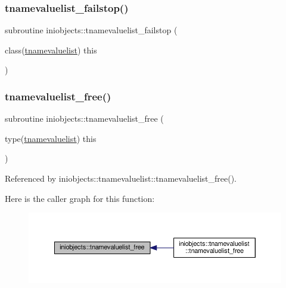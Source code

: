 \mbox{\label{namespaceiniobjects_a0e1ea28af24ea8496e138262c1da71f0}} 
\subsubsection{\texorpdfstring{tnamevaluelist\+\_\+failstop()}{tnamevaluelist\_failstop()}}
{\footnotesize\ttfamily subroutine iniobjects\+::tnamevaluelist\+\_\+failstop (\begin{DoxyParamCaption}\item[{class(\mbox{\hyperlink{structiniobjects_1_1tnamevaluelist}{tnamevaluelist}})}]{this }\end{DoxyParamCaption})\hspace{0.3cm}{\ttfamily [private]}}

\mbox{\label{namespaceiniobjects_aaa465cf37dfe148879b8073a289ab2f8}} 
\subsubsection{\texorpdfstring{tnamevaluelist\+\_\+free()}{tnamevaluelist\_free()}}
{\footnotesize\ttfamily subroutine iniobjects\+::tnamevaluelist\+\_\+free (\begin{DoxyParamCaption}\item[{type(\mbox{\hyperlink{structiniobjects_1_1tnamevaluelist}{tnamevaluelist}})}]{this }\end{DoxyParamCaption})\hspace{0.3cm}{\ttfamily [private]}}



Referenced by iniobjects\+::tnamevaluelist\+::tnamevaluelist\+\_\+free().

Here is the caller graph for this function\+:
\nopagebreak
\begin{figure}[H]
\begin{center}
\leavevmode
\includegraphics[width=350pt]{namespaceiniobjects_aaa465cf37dfe148879b8073a289ab2f8_icgraph}
\end{center}
\end{figure}
\mbox{\label{namespaceiniobjects_ae95e15db4e04c8026f9193252ebe48e6}} 
